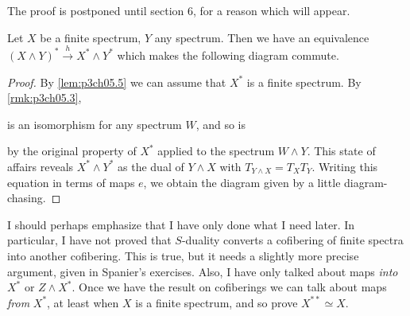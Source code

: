 \documentclass[../main]{subfiles}
\begin{document}
The proof is postponed until section 6, for a reason which will appear.

\begin{proposition}
Let $X$ be a finite spectrum, $Y$ any spectrum. Then we have an equivalence $(X\wedge Y)^{\ast}\xrightarrow{h}X^{\ast}\wedge Y^{\ast}$ which makes the following diagram commute.
\begin{center}
\end{center}
\end{proposition}
\begin{proof}
By \ref{lem:p3ch05.5} we can assume that $X^{\ast}$ is a finite spectrum. By \ref{rmk:p3ch05.3}, 
\begin{center}
\end{center}
is an isomorphism for any spectrum $W$, and so is
\begin{center}
\end{center}
by the original property of $X^{\ast}$ applied to the spectrum $W\wedge Y$. This state of affairs reveals $X^{\ast}\wedge Y^{\ast}$ as the dual of $Y\wedge X$ with $T_{Y\wedge X}=T_XT_Y$. Writing this equation in terms of maps $e$, we obtain the diagram given by a little diagram-chasing.
\end{proof}

I should perhaps emphasize that I have only done what I need later. In particular, I have not proved that $S$-duality converts a cofibering of finite spectra into another cofibering. This is true, but it needs a slightly more precise argument, given in Spanier's exercises. Also, I have only talked about maps \emph{into} $X^{\ast}$ or $Z\wedge X^{\ast}$. Once we have the result on cofiberings we can talk about maps \emph{from} $X^{\ast}$, at least when $X$ is a finite spectrum, and so prove $X^{\ast\ast}\simeq X$. %
\end{document}
